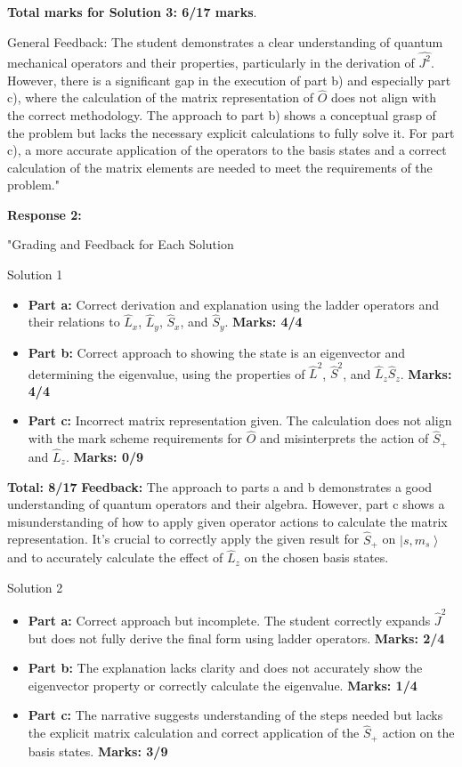 \documentclass[a4paper,11pt]{article}
\begin{document}
\textbf{Total marks for Solution 3: 6/17 marks}.

General Feedback: The student demonstrates a clear understanding of quantum mechanical operators and their properties, particularly in the derivation of \(\hat{J^{2}}\). However, there is a significant gap in the execution of part b) and especially part c), where the calculation of the matrix representation of \(\hat{O}\) does not align with the correct methodology. The approach to part b) shows a conceptual grasp of the problem but lacks the necessary explicit calculations to fully solve it. For part c), a more accurate application of the operators to the basis states and a correct calculation of the matrix elements are needed to meet the requirements of the problem."

\textbf{Response 2:}

"Grading and Feedback for Each Solution

Solution 1

\begin{itemize}
    \item \textbf{Part a:} Correct derivation and explanation using the ladder operators and their relations to \( \hat{L}_x \), \( \hat{L}_y \), \( \hat{S}_x \), and \( \hat{S}_y \). \textbf{Marks: 4/4}
    \item \textbf{Part b:} Correct approach to showing the state is an eigenvector and determining the eigenvalue, using the properties of \( \hat{L}^2 \), \( \hat{S}^2 \), and \( \hat{L}_z\hat{S}_z \). \textbf{Marks: 4/4}
    \item \textbf{Part c:} Incorrect matrix representation given. The calculation does not align with the mark scheme requirements for \( \hat{O} \) and misinterprets the action of \( \hat{S}_+ \) and \( \hat{L}_z \). \textbf{Marks: 0/9}
\end{itemize}

\textbf{Total: 8/17}  
\textbf{Feedback:} The approach to parts a and b demonstrates a good understanding of quantum operators and their algebra. However, part c shows a misunderstanding of how to apply given operator actions to calculate the matrix representation. It's crucial to correctly apply the given result for \( \hat{S}_+ \) on \( \left|s, m_s \right> \) and to accurately calculate the effect of \( \hat{L}_z \) on the chosen basis states.

Solution 2

\begin{itemize}
    \item \textbf{Part a:} Correct approach but incomplete. The student correctly expands \( \hat{J}^2 \) but does not fully derive the final form using ladder operators. \textbf{Marks: 2/4}
    \item \textbf{Part b:} The explanation lacks clarity and does not accurately show the eigenvector property or correctly calculate the eigenvalue. \textbf{Marks: 1/4}
    \item \textbf{Part c:} The narrative suggests understanding of the steps needed but lacks the explicit matrix calculation and correct application of the \( \hat{S}_+ \) action on the basis states. \textbf{Marks: 3/9}
\end{itemize}
\end{document}
